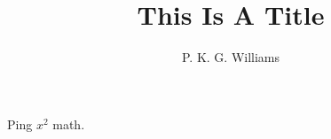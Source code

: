 \documentclass{article}
\title{This Is A Title}
\author{P. K. G. Williams}
\begin{document}
Ping $x^2$ math.

\end{document}
